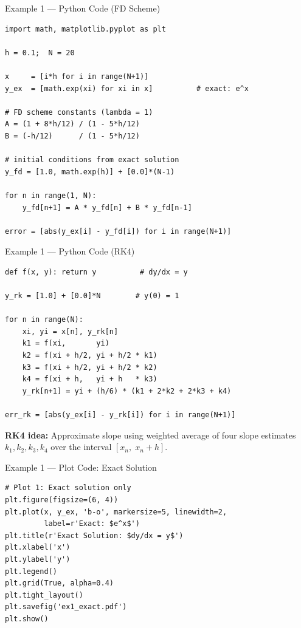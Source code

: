 \documentclass{beamer}
\begin{document}
\begin{frame}[fragile]{Example 1 — Python Code (FD Scheme)}

\begin{lstlisting}[style=pythonstyle]
import math, matplotlib.pyplot as plt

h = 0.1;  N = 20

x     = [i*h for i in range(N+1)]
y_ex  = [math.exp(xi) for xi in x]          # exact: e^x

# FD scheme constants (lambda = 1)
A = (1 + 8*h/12) / (1 - 5*h/12)
B = (-h/12)      / (1 - 5*h/12)

# initial conditions from exact solution
y_fd = [1.0, math.exp(h)] + [0.0]*(N-1)

for n in range(1, N):
    y_fd[n+1] = A * y_fd[n] + B * y_fd[n-1]

error = [abs(y_ex[i] - y_fd[i]) for i in range(N+1)]
\end{lstlisting}

\end{frame}

\begin{frame}[fragile]{Example 1 — Python Code (RK4)}

\begin{lstlisting}[style=pythonstyle]
def f(x, y): return y          # dy/dx = y

y_rk = [1.0] + [0.0]*N        # y(0) = 1

for n in range(N):
    xi, yi = x[n], y_rk[n]
    k1 = f(xi,       yi)
    k2 = f(xi + h/2, yi + h/2 * k1)
    k3 = f(xi + h/2, yi + h/2 * k2)
    k4 = f(xi + h,   yi + h   * k3)
    y_rk[n+1] = yi + (h/6) * (k1 + 2*k2 + 2*k3 + k4)

err_rk = [abs(y_ex[i] - y_rk[i]) for i in range(N+1)]
\end{lstlisting}

\vspace{0.2cm}
\textbf{RK4 idea:} Approximate slope using weighted average of four slope estimates $k_1, k_2, k_3, k_4$ over the interval $[x_n,\; x_n+h]$.

\end{frame}

\begin{frame}[fragile]{Example 1 — Plot Code: Exact Solution}

\begin{lstlisting}[style=pythonstyle]
# Plot 1: Exact solution only
plt.figure(figsize=(6, 4))
plt.plot(x, y_ex, 'b-o', markersize=5, linewidth=2,
         label=r'Exact: $e^x$')
plt.title(r'Exact Solution: $dy/dx = y$')
plt.xlabel('x')
plt.ylabel('y')
plt.legend()
plt.grid(True, alpha=0.4)
plt.tight_layout()
plt.savefig('ex1_exact.pdf')
plt.show()
\end{lstlisting}

\end{frame}
\end{document}
